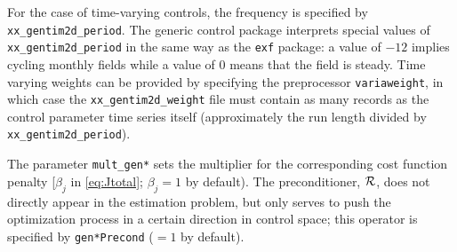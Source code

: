 For the case of time-varying controls, the frequency is specified by \texttt{xx\_gentim2d\_period}. The generic control package interprets special values of \texttt{xx\_gentim2d\_period} in the same way as the \texttt{exf} package: a value of $-12$ implies cycling monthly fields while a value of $0$ means that the field is steady. Time varying weights can be provided by specifying the preprocessor \texttt{variaweight}, in which case the \texttt{xx\_gentim2d\_weight} file must contain as many records as the control parameter time series itself (approximately the run length divided by \texttt{xx\_gentim2d\_period}). 

The parameter \texttt{mult\_gen*} sets the multiplier for the corresponding cost function penalty [$\beta_j$ in \eqref{eq:Jtotal}; $\beta_j = 1$ by default). The preconditioner, $\cal{R}$, does not directly appear in the estimation problem, but only serves to push the optimization process in a certain direction in control space; this operator is specified by \texttt{gen*Precond} ($=1$ by default). 



